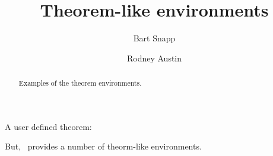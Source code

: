 \documentclass{ximera}
\author{Bart Snapp \and Rodney Austin}
\title{Theorem-like environments}
\begin{document}
\begin{abstract}
  Examples of the theorem environments.
\end{abstract}
\maketitle

A user defined theorem: 
\begin{MM}
 \lipsum[1][1-3]
\end{MM}

But, \ximera\ provides a number of theorm-like environments.

\begin{theorem}
 \lipsum[1][1-3]
\end{theorem}


\begin{theorem}[My theorem]
  \lipsum[1][1-3]
\end{theorem}

\begin{algorithm}
  \lipsum[1][1-3]
\end{algorithm}

\begin{axiom}
  \lipsum[1][1-3]
\end{axiom}

\begin{claim}
  \lipsum[1][1-3]
\end{claim}

\begin{conclusion}
  \lipsum[1][1-3]
\end{conclusion}

\begin{condition}
  \lipsum[1][1-3]
\end{condition}

\begin{conjecture}
  \lipsum[1][1-3]
\end{conjecture}

\begin{corollary}
  \lipsum[1][1-3]
\end{corollary}

\begin{criterion}
  \lipsum[1][1-3]
\end{criterion}

\begin{definition}
  \lipsum[1][1-3]
\end{definition}

\begin{example}
  \lipsum[1][1-3]
\end{example}
\end{document}
